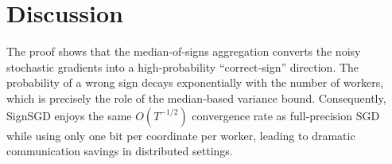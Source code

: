 \documentclass[11pt]{article}
\begin{document}
\section*{Discussion}
The proof shows that the median‑of‑signs aggregation converts the noisy stochastic gradients into a high‑probability “correct‑sign” direction. The probability of a wrong sign decays exponentially with the number of workers, which is precisely the role of the median‑based variance bound. Consequently, SignSGD enjoys the same $O(T^{-1/2})$ convergence rate as full‑precision SGD while using only one bit per coordinate per worker, leading to dramatic communication savings in distributed settings.
\end{document}
